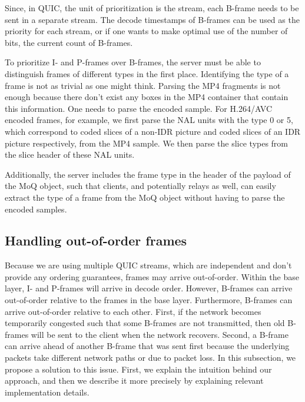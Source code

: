 Since, in QUIC, the unit of prioritization is the stream, each B-frame needs to be sent in a separate stream. The decode timestamps of B-frames can be used as the priority for each stream, or if one wants to make optimal use of the number of bits, the current count of B-frames.

To prioritize I- and P-frames over B-frames, the server must be able to distinguish frames of different types in the first place. Identifying the type of a frame is not as trivial as one might think. Parsing the MP4 fragments is not enough because there don't exist any boxes in the MP4 container that contain this information. One needs to parse the encoded sample. For H.264/AVC encoded frames, for example, we first parse the \ac{NAL} units with the type 0 or 5, which correspond to coded slices of a non-IDR picture and coded slices of an IDR picture respectively, from the MP4 sample. We then parse the slice types from the slice header of these NAL units.

Additionally, the server includes the frame type in the header of the payload of the MoQ object, such that clients, and potentially relays as well, can easily extract the type of a frame from the MoQ object without having to parse the encoded samples.

\subsection{Handling out-of-order frames}\label{section:out_of_order_frames}
Because we are using multiple QUIC streams, which are independent and don't provide any ordering guarantees, frames may arrive out-of-order. Within the base layer, I- and P-frames will arrive in decode order. However, B-frames can arrive out-of-order relative to the frames in the base layer. Furthermore, B-frames can arrive out-of-order relative to each other. First, if the network becomes temporarily congested such that some B-frames are not transmitted, then old B-frames will be sent to the client when the network recovers. Second, a B-frame can arrive ahead of another B-frame that was sent first because the underlying packets take different network paths or due to packet loss. %
In this subsection, we propose a solution to this issue. First, we explain the intuition behind our approach, and then we describe it more precisely by explaining relevant implementation details.

